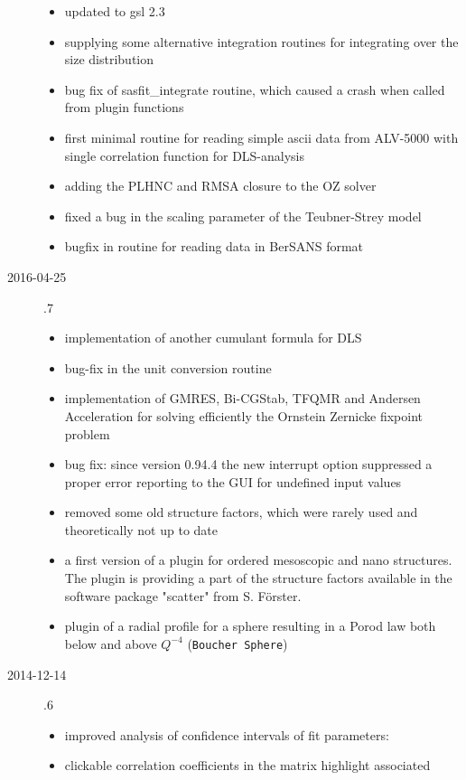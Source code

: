 \begin{description}
\begin{itemize}
        \item updated to gsl 2.3
        \item supplying some alternative integration routines for integrating over the size distribution
        \item bug fix of sasfit\_integrate routine, which caused a crash when called from plugin functions
        \item first minimal routine for reading simple ascii data from ALV-5000 with single correlation function for DLS-analysis
        \item adding the PLHNC and RMSA closure to the OZ solver
        \item fixed a bug in the scaling parameter of the Teubner-Strey model
        \item bugfix in routine for reading data in BerSANS format
    \end{itemize}
\item[2016-04-25] .7
    \begin{itemize}
        \item  implementation of another cumulant formula for DLS
        \item  bug-fix in the unit conversion routine
        \item  implementation of GMRES, Bi-CGStab, TFQMR and Andersen Acceleration
                for solving efficiently the Ornstein Zernicke fixpoint problem
        \item   bug fix: since version 0.94.4 the new interrupt option suppressed
                a proper error reporting to the GUI for undefined input values
        \item   removed some old structure factors,
                which were rarely used and theoretically not up to date
        \item   a first version of a plugin for ordered mesoscopic and nano structures.
                The plugin is providing a part of the structure factors available
                in the software package "scatter" from S. Förster.
        \item   plugin of a radial profile for a sphere resulting in a Porod law both below and above $Q^{-4}$ (\texttt{Boucher Sphere})
    \end{itemize}
\item[2014-12-14] .6
    \begin{itemize}
        \item improved analysis of confidence intervals of fit parameters:
        \item clickable correlation coefficients in the matrix highlight associated

\end{itemize}
\end{description}
